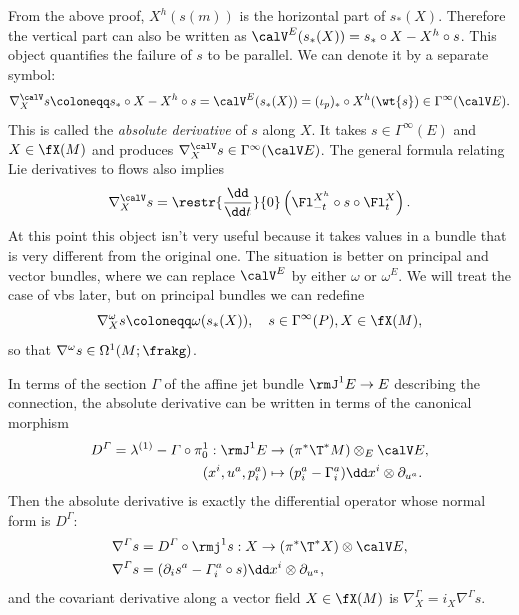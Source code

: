 \begin{rem}\label{rem absolute derivative}
    From the above proof, $X^h(s(m))$ is the horizontal part of $s_\ast(X)$. Therefore the vertical part can also be written as $\calV^E(s_\ast(X))=s_\ast\circ X-X^h\circ s$. This object quantifies the failure of $s$ to be parallel. We can denote it by a separate symbol:
    \[\nabla_X^{\calV} s\coloneqq s_\ast\circ X-X^h\circ s=\calV^E(s_\ast(X))=(\iota_p)_\ast\circ X^h(\wt{s})\in\Gamma^\infty(\calV E).\]
    This is called the \emph{absolute derivative} of $s$ along $X$. It takes $s\in\Gamma^\infty(E)$ and $X\in\fX(M)$ and produces $\nabla^\calV_X s\in \Gamma^\infty(\calV E)$. The general formula relating Lie derivatives to flows also implies
    \[\nabla_X^{\calV} s=\restr{\frac{\dd}{\dd t}}{0}\left(\Fl^{X^h}_{-t}\circ s\circ \Fl^X_t\right).\]
    At this point this object isn't very useful because it takes values in a bundle that is very different from the original one. The situation is better on principal and vector bundles, where we can replace $\calV^E$ by either $\omega$ or $\omega^E$. We will treat the case of \glspl{vb} later, but on principal bundles we can redefine
    \[\nabla_X^\omega s\coloneqq \omega(s_\ast(X)), \quad s\in\Gamma^\infty(P),X\in\fX(M),\]
    so that $\nabla^\omega s\in\Omega^1(M;\frakg)$.
\end{rem}

\begin{rem}\label{rem connections via jets 4}
    In terms of the section $\varGamma$ of the affine jet bundle $\rmJ^1 E\to E$ describing the connection, the absolute derivative can be written in terms of the canonical morphism 
    \begin{align}
        D^\varGamma=\lambda^{(1)}-\varGamma\circ \pi^1_0:\rmJ^1 E&\to (\pi^\ast\T^\ast M)\otimes_E \calV E,\\ 
        (x^i,u^a,p^a_i)&\mapsto (p^a_i-\Gamma^a_i)\dd x^i\otimes\partial_{u^a}.
    \end{align}
    Then the absolute derivative is exactly the differential operator whose normal form is $D^\varGamma$:
    \begin{align}
        \nabla^\varGamma s&=D^\varGamma\circ \rmj^1 s: X\to (\pi^\ast\T^\ast X)\otimes\calV E,\\
        \nabla^\varGamma s&=(\partial_is^a-\varGamma^a_i\circ s)\dd x^i\otimes\partial_{u^a},
    \end{align}
    and the covariant derivative along a vector field $X\in \fX(M)$ is $\nabla^\varGamma_X=i_X\nabla^\varGamma s$.
\end{rem}


